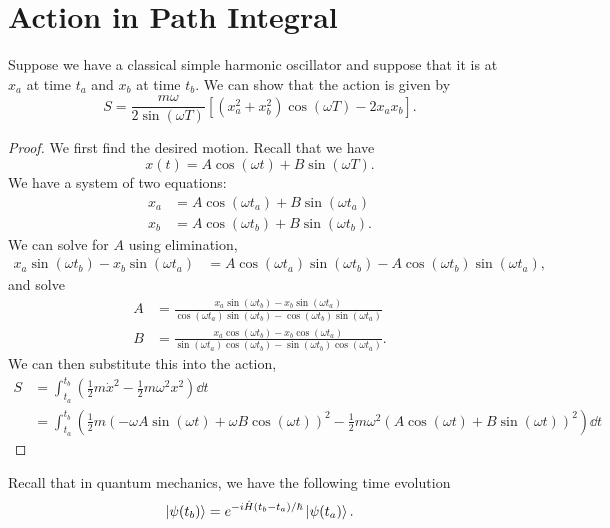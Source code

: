 \documentclass{article}
\numberwithin{equation}{section}
\begin{document}
\section{Action in Path Integral}
Suppose we have a classical simple harmonic oscillator and suppose that it is at $x_a$ at time $t_a$ and $x_b$ at time $t_b.$ We can show that the action is given by 
\begin{equation}
    S = \frac{m\omega}{2\sin(\omega T)}\left[(x_a^2+x_b^2)\cos(\omega T) - 2x_ax_b\right].
\end{equation}
\begin{proof}
    We first find the desired motion. Recall that we have 
    \begin{equation}
        x(t) = A\cos(\omega t) + B\sin(\omega T).
    \end{equation}
    We have a system of two equations:
    \begin{align}
        x_a &= A\cos(\omega t_a) + B\sin(\omega t_a) \\ 
        x_b &= A\cos(\omega t_b) + B\sin(\omega t_b).
    \end{align}
    We can solve for $A$ using elimination,
    \begin{align}
        x_a\sin(\omega t_b) -x_b\sin(\omega t_a) &= A\cos(\omega t_a)\sin(\omega t_b)  - A\cos(\omega t_b)\sin(\omega t_a),
    \end{align}
    and solve 
    \begin{align}
        A &= \frac{x_a\sin(\omega t_b) - x_b\sin(\omega t_a)}{\cos(\omega t_a)\sin(\omega t_b) - \cos(\omega t_b)\sin(\omega t_a)} \\ 
        B &= \frac{x_a\cos(\omega t_b) - x_b\cos(\omega t_a)}{\sin(\omega t_a)\cos(\omega t_b) - \sin(\omega t_b)\cos(\omega t_a)}.
    \end{align}
    We can then substitute this into the action,
    \begin{align}
        S &= \int_{t_a}^{t_b} \left(\frac{1}{2}m\dot{x}^2 - \frac{1}{2}m\omega^2 x^2\right) \dd{t} \\ 
        &= \int_{t_a}^{t_b} \left(\frac{1}{2}m \left(-\omega A\sin(\omega t) + \omega B\cos(\omega t)\right)^2 - \frac{1}{2}m\omega^2 \left(A\cos(\omega t) + B\sin(\omega t)\right)^2\right) \dd{t}
    \end{align}
\end{proof}
Recall that in quantum mechanics, we have the following time evolution 
\begin{align}
    \ket{\psi(t_b)} = e^{-i\hat{H}(t_b-t_a)/\hbar}\ket{\psi(t_a)}.
\end{align}
\end{document}
